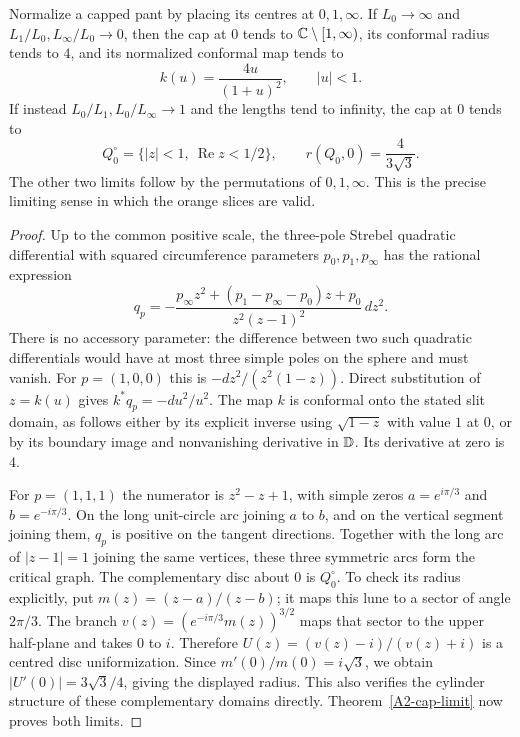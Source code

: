 \begin{corollary}\label{A2-explicit-limits}
Normalize a capped pant by placing its centres at $0,1,\infty$.
If $L_0\to\infty$ and $L_1/L_0,L_\infty/L_0\to0$, then the cap at
$0$ tends to ${\mathbb{C}}\setminus[1,\infty)$, its conformal radius tends to
$4$, and its normalized conformal map tends to
\[
 k(u)=\frac{4u}{(1+u)^2},\qquad |u|<1.
\]
If instead $L_0/L_1,L_0/L_\infty\to1$ and the lengths tend to infinity,
the cap at $0$ tends to
\[
 Q_0^\circ=\{|z|<1,\ \operatorname{Re}z<1/2\},
 \qquad r(Q_0,0)=\frac4{3\sqrt3}.
\]
The other two limits follow by the permutations of $0,1,\infty$.
This is the precise limiting sense in which the orange slices are valid.
\end{corollary}
\begin{proof}
Up to the common positive scale, the three-pole Strebel quadratic
differential with squared circumference parameters $p_0,p_1,p_\infty$
has the rational expression
\[
 q_p=-\frac{p_\infty z^2+(p_1-p_\infty-p_0)z+p_0}
              {z^2(z-1)^2}\,dz^2.
\]
There is no accessory parameter: the difference between two such
quadratic differentials would have at most three simple poles on the
sphere and must vanish. For $p=(1,0,0)$ this is
$-dz^2/(z^2(1-z))$. Direct substitution of $z=k(u)$ gives
$k^*q_p=-du^2/u^2$. The map $k$ is conformal onto the stated slit
domain, as follows either by its explicit inverse using
$\sqrt{1-z}$ with value $1$ at $0$, or by its boundary image and
nonvanishing derivative in ${\mathbb{D}}$. Its derivative at zero is $4$.

For $p=(1,1,1)$ the numerator is $z^2-z+1$, with simple zeros
$a=e^{i\pi/3}$ and $b=e^{-i\pi/3}$. On the long unit-circle arc
joining $a$ to $b$, and on the vertical segment joining them,
$q_p$ is positive on the tangent directions. Together with the long
arc of $|z-1|=1$ joining the same vertices, these three symmetric
arcs form the critical graph. The complementary disc about $0$ is
$Q_0^\circ$. To check its radius explicitly, put
$m(z)=(z-a)/(z-b)$; it maps this lune to a sector of angle $2\pi/3$.
The branch $v(z)=(e^{-i\pi/3}m(z))^{3/2}$ maps that sector to the
upper half-plane and takes $0$ to $i$. Therefore
$U(z)=(v(z)-i)/(v(z)+i)$ is a centred disc uniformization.
Since $m'(0)/m(0)=i\sqrt3$, we obtain
$|U'(0)|=3\sqrt3/4$, giving the displayed radius. This also verifies
the cylinder structure of these complementary domains directly.
Theorem~\ref{A2-cap-limit} now proves both limits.
\end{proof}

